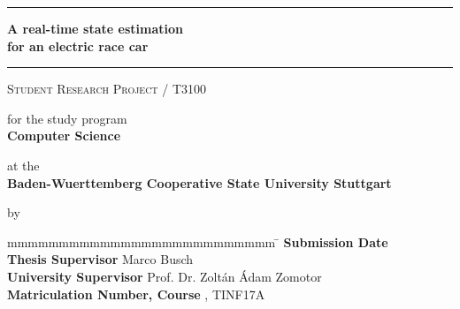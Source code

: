 \hfill
{}

\vfill
\begin{center}
	\rule{\textwidth}{1pt}
	{
		\Huge
		\bfseries
		A real-time state estimation \\ for an electric race car
		\par
	}
	\vspace{-0.2cm} 
	\rule{\textwidth}{1pt}

	\vfill

	\textsc{Student Research Project / T3100}
	
	\vfill

	for the study program \\ \textbf{Computer Science}
	
	at the \\ \textbf{Baden-Wuerttemberg Cooperative State University Stuttgart}
	
	by \\ \textbf{\@author}
\end{center}

\vfill

\begin{tabbing}
	mmmmmmmmmmmmmmmmmmmmmmmmmm				\= \kill
	\textbf{Submission Date}				\> \@date \\
	\textbf{Thesis Supervisor}           	\> Marco Busch \\
	\textbf{University Supervisor}          \> Prof. Dr. Zoltán Ádam Zomotor \\
	\textbf{Matriculation Number, Course}  	, TINF17A
\end{tabbing}
